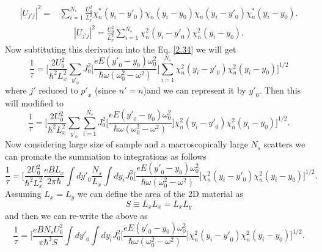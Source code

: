 \begin{equation} \label{2.39}
  \begin{aligned}
    |U_{j'j}|^2 = &
    \sum_{i =1}^{N_s}
    \frac{U_0^2}{L_x^2}
      \chi_n^* (y_i - {y'}_0)
      \chi_n (y_i - {y}_0)
      \chi_n (y_i - {y'}_0)
      \chi_n^* (y_i - {y}_0).
  \end{aligned}
\end{equation}
\begin{equation} \label{2.40}
  \begin{aligned}
    |U_{j'j}|^2 =
    \frac{U_0^2}{L_x^2}
    \sum_{i =1}^{N_s}
      \chi_n^2 (y_i - {y'}_0)
      \chi_n^2 (y_i - {y}_0).
  \end{aligned}
\end{equation}
Now subtituting this derivation into the Eq. \eqref{2.34} we will get
\begin{equation} \label{2.41}
    \frac{1}{\tau} =
    \bigg[
    \frac{2U_0^2}{\hbar^2 L_x^2}
    \sum_{{y'}_0}
    J_0^2\bigg[\frac{eE({y'}_0 - y_0)\omega_0^2}{\hbar\omega(\omega_0^2-\omega^2)}\bigg]
    \sum_{i =1}^{N_s}
      \chi_n^2 (y_i - {y'}_0)
      \chi_n^2 (y_i - {y}_0)
    \bigg]^{1/2}
\end{equation}
where $j'$ reduced to ${p'}_x$ (since $n'=n$)and we can represent it by ${y'}_0$. Then this will modified to
\begin{equation} \label{2.42}
    \frac{1}{\tau} =
    \bigg[
    \frac{2U_0^2}{\hbar^2 L_x^2}
    \sum_{{y'}_0}
    \sum_{i =1}^{N_s}
    J_0^2\bigg[\frac{eE({y'}_0 - y_0)\omega_0^2}{\hbar\omega(\omega_0^2-\omega^2)}\bigg]
      \chi_n^2 (y_i - {y'}_0)
      \chi_n^2 (y_i - {y}_0)
    \bigg]^{1/2}.
\end{equation}
Now considering large size of sample and a macroscopically large $N_s$ scatters we can promate the summation to integrations as follows
\begin{equation} \label{2.43}
    \frac{1}{\tau} =
    \bigg[
    \frac{2U_0^2}{\hbar^2 L_x^2}
    \frac{eB L_x}{2\pi\hbar}\int d{y'}_0
    \frac{N_s} {L_x}\int dy_i
    J_0^2\bigg[\frac{eE({y'}_0 - y_0)\omega_0^2}{\hbar\omega(\omega_0^2-\omega^2)}\bigg]
      \chi_n^2 (y_i - {y'}_0)
      \chi_n^2 (y_i - {y}_0)
    \bigg]^{1/2}.
\end{equation}
Assuming $L_x = L_y$ we can define the area of the 2D material as
\begin{equation} \label{2.44}
    S \equiv L_xL_x = L_xL_y
\end{equation}
and then we can re-write the above as
\begin{equation} \label{2.45}
    \frac{1}{\tau} =
    \bigg[
    \frac{eBN_sU_0^2}{\pi\hbar^3 S}
    \int d{y'}_0
    \int dy_i
    J_0^2\bigg[\frac{eE({y'}_0 - y_0)\omega_0^2}{\hbar\omega(\omega_0^2-\omega^2)}\bigg]
      \chi_n^2 (y_i - {y'}_0)
      \chi_n^2 (y_i - {y}_0)
    \bigg]^{1/2}.
\end{equation}

